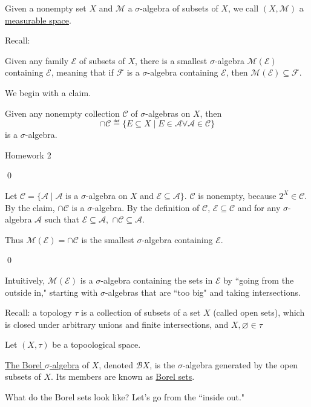 \documentclass[x11names,reqno,14pt]{extarticle}
\begin{document}
Given a nonempty set $X$ and $\mathcal{M}$ a $\sigma$-algebra of subsets of $X$, we call $(X, \mathcal{M})$ a \underline{measurable space}.

Recall: 

\prop

Given any family $\mathcal{E}$ of subsets of $X$, there is a smallest $\sigma$-algebra $\mathcal{M}(\mathcal{E})$ containing $\mathcal{E}$, meaning that if $\mathcal{F}$ is a $\sigma$-algebra containing $\mathcal{E}$, then $\mathcal{M}(\mathcal{E}) \subseteq \mathcal{F}$. 

\proof

We begin with a claim. 

\claim Given any nonempty collection $\mathcal{C}$ of $\sigma$-algebras on $X$, then 
\[
\cap \mathcal{C} \eqdef \{E \subseteq X \mid E \in \mathcal{A} \forall \mathcal{A} \in \mathcal{C}\}
\]
is a $\sigma$-algebra. 

\proof Homework 2

\qed

Let $\mathcal{C} = \{\mathcal{A} \mid \mathcal{A}$ is a $\sigma$-algebra on $X$ and $\mathcal{E} \subseteq \mathcal{A}\}$. $\mathcal{C}$ is nonempty, because $2^X \in \mathcal{C}$. By the claim, $\cap\mathcal{C}$ is a $\sigma$-algebra. By the definition of $\mathcal{C}$, $\mathcal{E}\subseteq\mathcal{C}$ and for any $\sigma$-algebra $\mathcal{A}$ such that $\mathcal{E} \subseteq \mathcal{A},$ $\cap\mathcal{C} \subseteq \mathcal{A}$.

Thus $\mathcal{M}(\mathcal{E}) = \cap\mathcal{C}$ is the smallest $\sigma$-algebra containing $\mathcal{E}$.

\qed 

\rem Intuitively, $\mathcal{M}(\mathcal{E})$ is a $\sigma$-algebra containing the sets in $\mathcal{E}$ by ``going from the outside in," starting with $\sigma$-algebras that are ``too big" and taking intersections. 

Recall: a topology $\tau$ is a collection of subsets of a set $X$ (called open sets), which is closed under arbitrary unions and finite intersections, and $X, \varnothing \in \tau$

Let $(X, \tau)$ be a topoological space. 

 \underline{The Borel $\sigma$-algebra} of $X$, denoted $\mathcal{B}X$, is the $\sigma$-algebra generated by the open subsets of $X$. Its members are known as \underline{Borel sets}. 

What do the Borel sets look like? Let's go from the ``inside out." 
\end{document}
